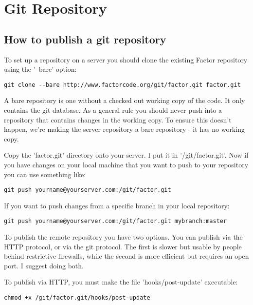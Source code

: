 \chapter{Git Repository}\label{git}

\section{How to publish a git repository}

To set up a repository on a server you should clone the existing
Factor repository using the '--bare' option:

\begin{verbatim}
git clone --bare http://www.factorcode.org/git/factor.git factor.git
\end{verbatim}

A bare repository is one without a checked out working copy of the
code. It only contains the git database. As a general rule you should
never push into a repository that contains changes in the working
copy. To ensure this doesn't happen, we're making the server
repository a bare repository - it has no working copy.

Copy the 'factor.git' directory onto your server. I put it in
'/git/factor.git'. Now if you have changes on your local machine that
you want to push to your repository you can use something like:

\begin{verbatim}
git push yourname@yourserver.com:/git/factor.git
\end{verbatim}

If you want to push changes from a specific branch in your local
repository:

\begin{verbatim}
git push yourname@yourserver.com:/git/factor.git mybranch:master
\end{verbatim}

To publish the remote repository you have two options. You can publish
via the HTTP protocol, or via the git protocol. The first is slower
but usable by people behind restrictive firewalls, while the second is
more efficient but requires an open port. I suggest doing both.

To publish via HTTP, you must make the file 'hooks/post-update'
executable:

\begin{verbatim}
chmod +x /git/factor.git/hooks/post-update
\end{verbatim}

